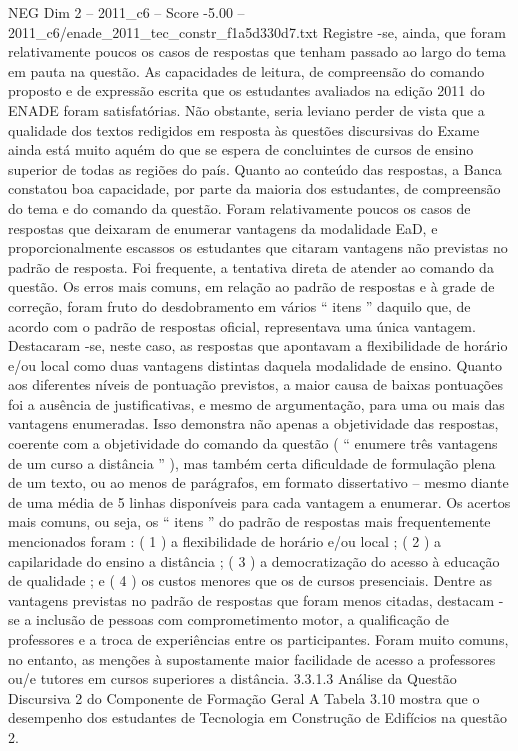 \begin{textsample}{NEG Dim 2 – 2011\_c6 – Score -5.00 – 2011\_c6/enade\_2011\_tec\_constr\_f1a5d330d7.txt}
Registre -se, ainda, que foram relativamente poucos os casos de respostas que tenham passado ao largo do tema em pauta na questão.
As capacidades de leitura, de compreensão do comando proposto e de expressão escrita que os estudantes avaliados na edição 2011 do ENADE foram satisfatórias.
Não obstante, seria leviano perder de vista que a qualidade dos textos redigidos em resposta às questões discursivas do Exame ainda está muito aquém do que se espera de concluintes de cursos de ensino superior de todas as regiões do país.
Quanto ao conteúdo das respostas, a Banca constatou boa capacidade, por parte da maioria dos estudantes, de compreensão do tema e do comando da questão.
Foram relativamente poucos os casos de respostas que deixaram de enumerar vantagens da modalidade EaD, e proporcionalmente escassos os estudantes que citaram vantagens não previstas no padrão de resposta.
Foi frequente, a tentativa direta de atender ao comando da questão.
Os erros mais comuns, em relação ao padrão de respostas e à grade de correção, foram fruto do desdobramento em vários “ itens ” daquilo que, de acordo com o padrão de respostas oficial, representava uma única vantagem.
Destacaram -se, neste caso, as respostas que apontavam a flexibilidade de horário e/ou local como duas vantagens distintas daquela modalidade de ensino.
Quanto aos diferentes níveis de pontuação previstos, a maior causa de baixas pontuações foi a ausência de justificativas, e mesmo de argumentação, para uma ou mais das vantagens enumeradas.
Isso demonstra não apenas a objetividade das respostas, coerente com a objetividade do comando da questão ( “ enumere três vantagens de um curso a distância ” ), mas também certa dificuldade de formulação plena de um texto, ou ao menos de parágrafos, em formato dissertativo – mesmo diante de uma média de 5 linhas disponíveis para cada vantagem a enumerar.
Os acertos mais comuns, ou seja, os “ itens ” do padrão de respostas mais frequentemente mencionados foram : ( 1 ) a flexibilidade de horário e/ou local ; ( 2 ) a capilaridade do ensino a distância ; ( 3 ) a democratização do acesso à educação de qualidade ; e ( 4 ) os custos menores que os de cursos presenciais.
Dentre as vantagens previstas no padrão de respostas que foram menos citadas, destacam -se a inclusão de pessoas com comprometimento motor, a qualificação de professores e a troca de experiências entre os participantes.
Foram muito comuns, no entanto, as menções à supostamente maior facilidade de acesso a professores ou/e tutores em cursos superiores a distância. 3.3.1.3 Análise da Questão Discursiva 2 do Componente de Formação Geral A Tabela 3.10 mostra que o desempenho dos estudantes de Tecnologia em Construção de Edifícios na questão 2.

\end{textsample}
